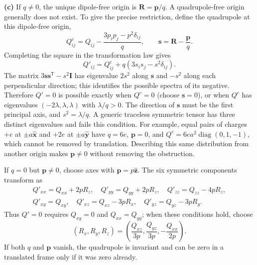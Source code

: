 \textbf{(c)} If $q\ne0$, the unique dipole-free origin is
$\boxed{\mathbf R=\mathbf p/q}$. A quadrupole-free origin generally does
not exist. To give the precise restriction, define the quadrupole at
this dipole-free origin,
\[
Q^{c}_{ij}=Q_{ij}-\frac{3p_ip_j-p^2\delta_{ij}}q,
\qquad \mathbf s=\mathbf R-\frac{\mathbf p}q.
\]
Completing the square in the transformation law gives
\[
Q'_{ij}=Q^c_{ij}+q(3s_is_j-s^2\delta_{ij}).
\]
The matrix $3\mathbf s\mathbf s^{\mathsf T}-s^2\mathbf I$ has
eigenvalue $2s^2$ along $\mathbf s$ and $-s^2$ along each perpendicular
direction; this identifies the possible spectra of its negative.
Therefore $Q'=0$ is possible exactly when $Q^c=0$ (choose $\mathbf s=0$),
or when $Q^c$ has eigenvalues $(-2\lambda,\lambda,\lambda)$ with
$\lambda/q>0$. The direction of $\mathbf s$ must be the first
principal axis, and $s^2=\lambda/q$. A generic traceless symmetric
tensor has three distinct eigenvalues and fails this condition.
For example, equal pairs of charges $+e$ at $\pm a\hat{\mathbf x}$ and
$+2e$ at $\pm a\hat{\mathbf y}$ have $q=6e$, $\mathbf p=0$, and
$Q^c=6ea^2\operatorname{diag}(0,1,-1)$, which cannot be removed by
translation. Describing this same distribution from another origin
makes $\mathbf p\ne0$ without removing the obstruction.

If $q=0$ but $\mathbf p\ne0$, choose axes with $\mathbf p=p\hat{\mathbf z}$.
The six symmetric components transform as
\begin{gather*}
Q'_{xx}=Q_{xx}+2pR_z,\quad Q'_{yy}=Q_{yy}+2pR_z,\quad
Q'_{zz}=Q_{zz}-4pR_z,\\
Q'_{xy}=Q_{xy},\quad Q'_{xz}=Q_{xz}-3pR_x,\quad
Q'_{yz}=Q_{yz}-3pR_y.
\end{gather*}
Thus $Q'=0$ requires $Q_{xy}=0$ and $Q_{xx}=Q_{yy}$; when these
conditions hold, choose
\[
(R_x,R_y,R_z)=\left(\frac{Q_{xz}}{3p},\frac{Q_{yz}}{3p},
-\frac{Q_{xx}}{2p}\right).
\]
If both $q$ and $\mathbf p$ vanish, the quadrupole is invariant and
can be zero in a translated frame only if it was zero already.

